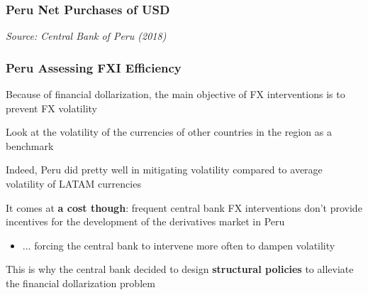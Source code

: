 \documentclass{beamer}
\newenvironment{wideitemize}{\itemize\addtolength{\itemsep}{10pt}}{\enditemize}
\begin{document}
\begin{frame}
\frametitle{Peru Net Purchases of USD}
\medskip
\emph{Source: Central Bank of Peru (2018)}
\end{frame}




\begin{frame}
  \frametitle{Peru Assessing FXI Efficiency}

  \begin{wideitemize}
    \item Because of financial dollarization, the main objective of FX interventions is to prevent FX volatility
    \item Look at the volatility of the currencies of other countries in the region as a benchmark
    \item Indeed, Peru did pretty well in mitigating volatility compared to average volatility of LATAM currencies
    \item It comes at \textbf{a cost though}: frequent central bank FX interventions don't provide incentives for the development of the derivatives market in Peru
      \begin{itemize}
      \item ... forcing the central bank to intervene more often to dampen volatility
      \end{itemize}
    \item This is why the central bank decided to design \textbf{structural policies} to alleviate the financial dollarization problem       
  \end{wideitemize}
  
\end{frame}
\end{document}
